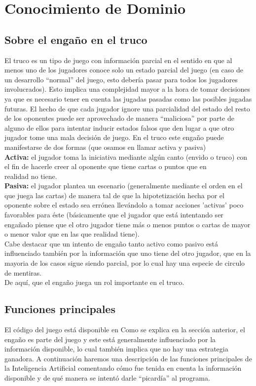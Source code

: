 \documentclass[12pt,a4paper]{article}
\begin{document}
\section{Conocimiento de Dominio}

\subsection{Sobre el enga\~no en el truco}

El truco es un tipo de juego con informaci\'on parcial en el sentido en que al menos uno de los jugadores
conoce solo un estado parcial del juego (en caso de un desarrollo ``normal'' del juego, esto deber\'ia 
pasar para todos los jugadores involucrados). Esto implica una complejidad mayor a la hora de tomar decisiones
ya que es necesario tener en cuenta las jugadas pasadas como las posibles jugadas futuras. 
El hecho de que cada jugador ignore una parcialidad del estado del resto de los oponentes puede ser aprovechado
de manera ``maliciosa'' por parte de alguno de ellos para intentar inducir estados falsos que den lugar a que otro jugador
tome una mala decisi\'on de juego. En el truco este enga\~no puede manifestarse de dos formas (que osamos en llamar
activa y pasiva)\\
\textbf{Activa:} el jugador toma la iniciativa mediante alg\'un canto (envido o truco) con el fin de hacerle creer al oponente que tiene
cartas o puntos que en \\ realidad no tiene.\\
\textbf{Pasiva:} el jugador plantea un escenario (generalmente mediante el orden en el que juega las cartas) de manera tal de que 
la hipotetizaci\'on hecha por el oponente sobre el estado sea err\'onea llev\'andolo a tomar acciones 'activas' poco favorables para 
\'este (b\'asicamente que el jugador que est\'a intentando ser enga\~nado piense que el otro jugador tiene m\'as o menos puntos o cartas de 
mayor o menor valor que en las que realidad tiene).\\
Cabe destacar que un intento de enga\~no tanto activo como pasivo est\'a influenciado tambi\'en por la informaci\'on que uno tiene del otro jugador,
que en la mayoria de los casos sigue siendo parcial,  por lo cual hay una especie de circulo de mentiras.\\
De aqu\'i, que el enga\~no juega un rol importante en el truco.

\subsection{Funciones principales}
El c\'odigo del juego est\'a disponible en \cite{codigo}
Como se explica en la secci\'on anterior, el enga\~no es parte del juego y este est\'a generalmente influenciado por
la informaci\'on disponible, lo cual tambi\'en implica que no hay una estrategia ganadora. 
A continuaci\'on haremos una descripci\'on de las funciones principales de la Inteligencia Artificial comentando c\'omo fue tenida en cuenta la 
informaci\'on disponible y de qu\'e manera se intent\'o darle ``picard\'ia'' al programa.
\end{document}
